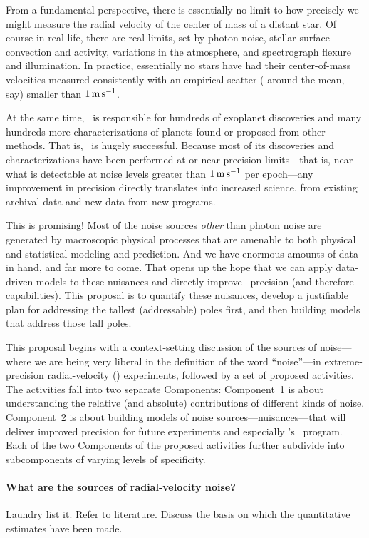\documentclass[12pt, fullpage, letterpaper]{article}
\begin{document}
From a fundamental perspective, there is essentially no limit to how
precisely we might measure the radial velocity of the center of mass
of a distant star. Of course in real life, there are real limits, set
by photon noise, stellar surface convection and activity,
variations in the atmosphere, and spectrograph flexure and illumination. In practice,
essentially no stars have had their center-of-mass velocities measured
consistently with an empirical scatter ( around the mean,
say) smaller than $1\,{\mathrm{m\,s^{-1}}}$.

At the same time, \EPRV\ is responsible for hundreds of 
exoplanet discoveries and many hundreds more characterizations of planets
found or proposed from other methods. That is, \EPRV\ is hugely successful.
Because most of its discoveries and characterizations have been performed
at or near precision limits---that is, near what is detectable at noise levels
greater than $1\,{\mathrm{m\,s^{-1}}}$ per epoch---any improvement in precision directly
translates into increased science, from existing archival data and new data
from new programs.

This is promising! Most of the noise sources \emph{other} than photon noise
are generated by macroscopic physical processes that are amenable to both
physical and statistical modeling and prediction. And we have enormous amounts
of data in hand, and far more to come. That opens up the hope
that we can apply data-driven models to these nuisances and directly improve
\EPRV\ precision (and therefore capabilities). This proposal is to quantify
these nuisances, develop a justifiable plan for addressing the tallest
(addressable) poles first, and then building models that address those tall
poles.

This proposal begins with a context-setting discussion of the sources
of noise---where we are being very liberal in the definition of the
word ``noise''---in extreme-precision radial-velocity (\EPRV) experiments,
followed by a set of proposed activities. The activities fall into two
separate Components: Component~1 is about understanding the relative
(and absolute) contributions of different kinds of noise. Component~2
is about building models of noise sources---nuisances---that will
deliver improved precision for future experiments and especially \NASA's
\NNEXPLORE\ program. Each of the two Components of the proposed activities
further subdivide into subcomponents of varying levels of specificity.

\paragraph{What are the sources of radial-velocity noise?}
Laundry list it. Refer to literature. Discuss the basis on
which the quantitative estimates have been made.
\end{document}
